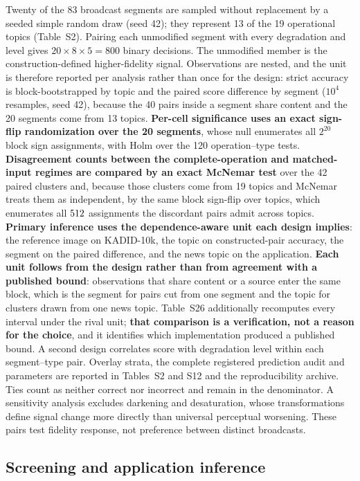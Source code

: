 Twenty of the 83 broadcast segments are sampled without replacement by a seeded
simple random draw (seed 42); they represent 13 of the 19 operational topics
(Table~S2). Pairing each unmodified segment with every degradation and level gives
$20\times8\times5=800$ binary decisions. The unmodified member is the construction-defined higher-fidelity signal.
Observations are nested, and the unit is therefore reported per analysis rather than once
for the design: strict accuracy is block-bootstrapped by topic and the paired score
difference by segment ($10^4$ resamples, seed 42), because the 40 pairs inside a segment
share content and the 20 segments come from 13 topics. \textbf{Per-cell significance uses
an exact sign-flip randomization over the 20 segments}, whose null enumerates all $2^{20}$
block sign assignments, with Holm over the 120 operation--type tests. \textbf{Disagreement
counts between the complete-operation and matched-input regimes are compared by an exact
McNemar test} over the 42 paired clusters and, because those clusters come from 19 topics
and McNemar treats them as independent, by the same block sign-flip over topics, which
enumerates all $512{}$ assignments the discordant pairs admit across
\mcnBlocos{} topics. \textbf{Primary inference uses the dependence-aware unit each design
implies}: the reference image on KADID-10k, the topic on constructed-pair accuracy, the
segment on the paired difference, and the news topic on the application. \textbf{Each unit follows from the
design rather than from agreement with a published bound}: observations that share content
or a source enter the same block, which is the segment for pairs cut from one segment and
the topic for clusters drawn from one news topic. Table~S26 additionally recomputes every
interval under the rival unit; \textbf{that comparison is a verification, not a reason for
the choice}, and it identifies which implementation produced a published bound. A second design correlates score with degradation
level within each segment--type pair. Overlay strata, the complete registered
prediction audit and parameters are reported in Tables~S2 and S12 and the
reproducibility archive. Ties count as neither correct nor incorrect and remain
in the denominator. A sensitivity analysis excludes darkening and desaturation,
whose transformations define signal change more directly than universal
perceptual worsening. These pairs test fidelity response, not preference between
distinct broadcasts.

\subsection{Screening and application inference}\label{sec:screen}

